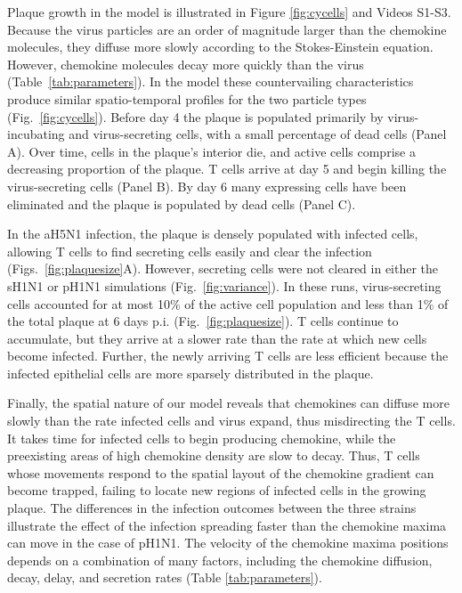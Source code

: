 \documentclass[preprint,10pt,authoryear]{elsarticle}
\begin{document}
Plaque growth in the model is illustrated in Figure \ref{fig:cycells} and Videos S1-S3.  Because the virus particles are an order of magnitude larger than the chemokine molecules, they diffuse more slowly according to the Stokes-Einstein equation.  However, chemokine molecules decay more quickly than the virus (Table~\ref{tab:parameters}).  In the model these countervailing characteristics produce similar spatio-temporal profiles for the two particle types (Fig.~\ref{fig:cycells}). Before day 4 the plaque is populated primarily by virus-incubating and virus-secreting cells, with a small percentage of dead cells (Panel A). Over time, cells in the plaque's interior die, and active cells comprise a decreasing proportion of the plaque. T cells arrive at day 5 and begin killing the virus-secreting cells (Panel B). By day 6 many expressing cells have been eliminated and the plaque is populated by dead cells (Panel C).  

In the aH5N1 infection, the plaque is densely populated with infected cells, allowing T cells to find secreting cells easily and clear the infection (Figs.~\ref{fig:plaquesize}A).  However, secreting cells were not cleared in either the sH1N1 or pH1N1 simulations (Fig.~\ref{fig:variance}).  In these runs, virus-secreting cells accounted for at most 10\% of the active cell population and less than 1\% of the total plaque at 6 days p.i. (Fig.~\ref{fig:plaquesize}).  T cells continue to accumulate, but they arrive at a slower rate than the rate at which new cells become infected.  Further, the newly arriving T cells are less efficient because the infected epithelial cells are more sparsely distributed in the plaque.

Finally, the spatial nature of our model reveals that chemokines can diffuse more slowly than the rate infected cells and virus expand, thus misdirecting the T cells.  It takes time for infected cells to begin producing chemokine, while the preexisting areas of high chemokine density are slow to decay.  Thus, T cells whose movements respond to the spatial layout of the chemokine gradient can become trapped, failing to locate new regions of infected cells in the growing plaque.  The differences in the infection outcomes between the three strains illustrate the effect of the infection spreading faster than the chemokine maxima can move in the case of pH1N1.  The velocity of the chemokine maxima positions depends on a combination of many factors, including the chemokine diffusion, decay, delay, and secretion rates (Table \ref{tab:parameters}).
\end{document}
